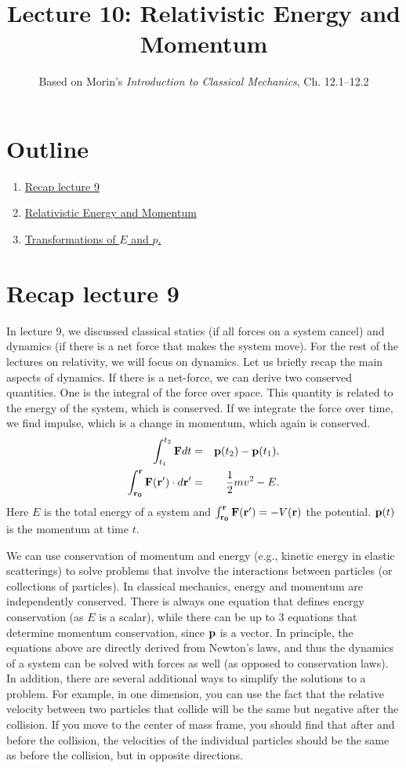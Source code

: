 \documentclass[12pt]{article}
\title{\textbf{Lecture 10: Relativistic Energy and Momentum}}
\author{Based on Morin's \textit{Introduction to Classical Mechanics}, Ch. 12.1--12.2}
\date{}
\newcommand{\be}{\begin{eqnarray}}
\newcommand{\ee}{\end{eqnarray}}
\begin{document}
\maketitle

\section*{Outline}
\begin{enumerate}
    \item \href{sec:recap}{Recap lecture 9}
    \item \href{sec:EandP}{Relativistic Energy and Momentum}
    \item \href{sec:Transformations}{Transformations of $E$ and $p$.}
\end{enumerate}

\section{Recap lecture 9}\label{sec:recap}
In lecture 9, we discussed classical statics (if all forces on a system cancel) and dynamics (if there is a net force that makes the system move). For the rest of the lectures on relativity, we will focus on dynamics. Let us briefly recap the main aspects of dynamics. 
If there is a net-force, we can derive two conserved quantities. One is the integral of the force over space. This quantity is related to the energy of the system, which is conserved. If we integrate the force over time, we find impulse, which is a change in momentum, which again is conserved.
\be
\int_{t_1}^{t_2} {\bf F} dt &=& {\bf p}(t_2)-{\bf p}(t_1). \\ 
\int_{\bf r_0}^{\bf r} {\bf F}({\bf r'}) \cdot d{\bf r'} &=& \frac{1}{2}m v^2-E. 
\ee
Here $E$ is the total energy of a system and $\int_{\bf r_0}^{\bf r} {\bf F}({\bf r'}) = - V({\bf r})$ the potential. ${\bf p}(t)$ is the momentum at time $t$. 

We can use conservation of momentum and energy (e.g., kinetic energy in elastic scatterings) to solve problems that involve the interactions between particles (or collections of particles). In classical mechanics, energy and momentum are independently conserved. There is always one equation that defines energy conservation (as $E$ is a scalar), while there can be up to $3$ equations that determine momentum conservation, since ${\bf p}$ is a vector. In principle, the equations above are directly derived from Newton's laws, and thus the dynamics of a system can be solved with forces as well (as opposed to conservation laws). In addition, there are several additional ways to simplify the solutions to a problem. For example, in one dimension, you can use the fact that the relative velocity between two particles that collide will be the same but negative after the collision. If you move to the center of mass frame, you should find that after and before the collision, the velocities of the individual particles should be the same as before the collision, but in opposite directions. 
\end{document}
